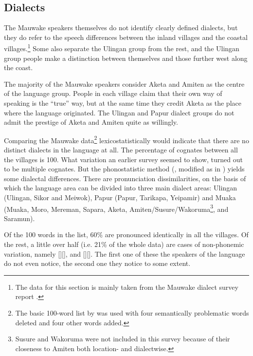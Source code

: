 \subsection{Dialects}


The Mauwake speakers themselves do not identify clearly defined dialects, but they do refer to the speech differences between the inland villages and the coastal villages.\footnote{The data for this section is mainly taken from the Mauwake dialect survey report \citep{Jarvinen1988b}.} Some also separate the Ulingan group from the rest, and the Ulingan group people make a distinction between themselves and those further west along the coast.

The majority of the Mauwake speakers consider Aketa and Amiten as the centre of the language group. People in each village claim that their own way of speaking is the ``true'' way, but at the same time they credit Aketa as the place where the language originated.  The Ulingan and Papur dialect groups do not admit the prestige of Aketa and Amiten quite as willingly.

Comparing the Mauwake data\footnote{The basic 100-word list by \citet[55--59]{Ezard1977} was used with four semantically problematic words deleted and four other words added.} lexicostatistically would indicate that there are no distinct dialects in the language at all. The percentage of cognates between all the villages is 100.  What variation an earlier survey seemed to show, turned out to be multiple cognates. But the phonostatistic method (\citealt{GrimesEtAl1959}, modified as in \citealt[177--178]{Simons1977}) yields some dialectal differences. There are pronunciation dissimilarities, on the basis of which the language area can be divided into three main dialect areas: Ulingan (Ulingan, Sikor and Meiwok), Papur (Papur, Tarikapa, Yeipamir) and Muaka (Muaka, Moro, Mereman, Sapara, Aketa, Amiten/Susure/Wakoruma\footnote{Susure and Wakoruma were not included in this survey because of their closeness to Amiten both location- and dialectwise.}, and Saramun). 

Of the 100 words in the list, 60\% are pronounced identically in all the villages.  Of the rest, a little over half (i.e. 21\% of the whole data) are cases of non-phonemic variation, namely []{\Tilde}[\emphs{$\beta$}], and []{\Tilde}[\emphs{{\textyogh}}]. The first one of these the speakers of the language do not even notice, the second one they notice to some extent. 

